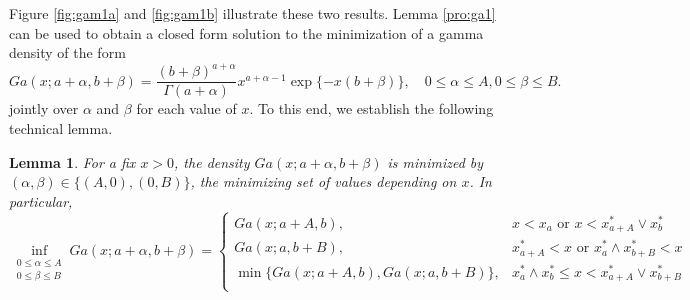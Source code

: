 \documentclass[11pt]{article}
\newtheorem{lemma}{Lemma}[section]
\begin{document}
	Figure \ref{fig:gam1a} and \ref{fig:gam1b} illustrate these two results. Lemma \ref{pro:ga1} can be used to obtain a closed form solution to the minimization of a gamma density of the form
	\begin{equation}
		\label{eq:ga}
		Ga(x;a+\alpha,b+\beta) = \frac{(b+\beta)^{a+\alpha}}{\Gamma(a+\alpha)}x^{a+\alpha-1}\exp\{-x(b+\beta)\}, \quad 0\le\alpha\le A, 0\le\beta\le B.
	\end{equation}
	jointly over $\alpha$ and $\beta$ for each value of $x$. To this end, we establish the following technical lemma.
	\begin{lemma}	
		\label{pro:ga2}
		For a fix $x>0$, the density $Ga(x;a+\alpha,b+\beta)$ is minimized by $(\alpha, \beta) \in \{(A, 0), (0, B)\}$, the minimizing set of values depending on $x$. In particular,	
		$$\inf_{\begin{aligned}
				0\le \alpha\le A \\ 0\le \beta\le B
		\end{aligned}}Ga(x;a+\alpha,b+\beta) = 
		\begin{cases}
			Ga(x;a+A,b)                     , & x<x_a         \text{ or } x<x_{a+A}^* \vee x_b^*\\
			Ga(x;a,b+B)                     , & x_{a+A}^* < x \text{ or } x_a^* \wedge x_{b+B}^* < x\\
			\min\{Ga(x;a+A,b), Ga(x;a,b+B)\}, & x_a^* \wedge x_b^*\le x < x_{a+A}^* \vee x_{b+B}^*\\
		\end{cases}$$
	\end{lemma}
	
\end{document}
